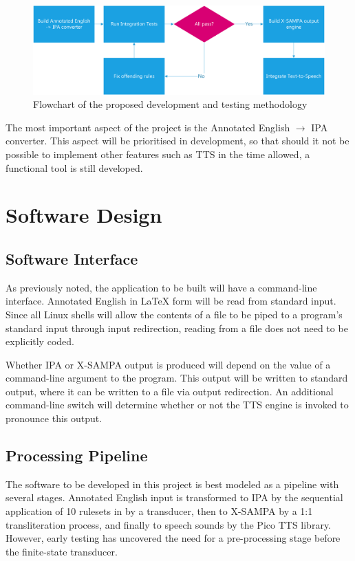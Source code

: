\documentclass[fleqn]{llncs}
\begin{document}
\begin{figure}[htp]
\includegraphics[width=0.9\linewidth]{development_flow.png}
\caption{Flowchart of the proposed development and testing methodology}
\label{fig:devflow}
\end{figure}

The most important aspect of the project is the Annotated English $ \rightarrow $ IPA converter. This aspect will be prioritised in development, so that should it not be possible to implement other features such as TTS in the time allowed, a functional tool is still developed.

\section{Software Design}

\subsection{Software Interface}
As previously noted, the application to be built will have a command-line interface. Annotated English in {\LaTeX} form will be read from standard input. Since all Linux shells will allow the contents of a file to be piped to a program's standard input through input redirection, reading from a file does not need to be explicitly coded. 

Whether IPA or X-SAMPA output is produced will depend on the value of a command-line argument to the program. This output will be written to standard output, where it can be written to a file via output redirection. An additional command-line switch will determine whether or not the TTS engine is invoked to pronounce this output.

\subsection{Processing Pipeline}
The software to be developed in this project is best modeled as a pipeline with several stages. Annotated English input is transformed to IPA by the sequential application of 10 rulesets in \cite{jose} by a transducer, then to X-SAMPA by a 1:1 transliteration process, and finally to speech sounds by the Pico TTS library. However, early testing has uncovered the need for a pre-processing stage before the finite-state transducer.
\end{document}
